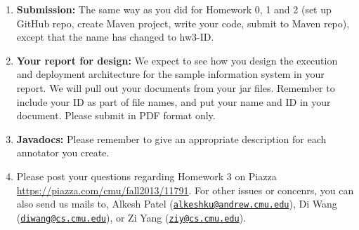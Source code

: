 \documentclass[oneside]{memoir}
\begin{document}
\begin{titlingpage}
\begin{minipage}{1.2\textwidth}
\begin{enumerate}

\item \textbf{Submission:} The same way as you did for Homework 0, 1 and 2 (set up
GitHub repo, create Maven project, write your code, submit to Maven repo),
except that the name has changed to hw3-ID.

\item \textbf{Your report for design:} We expect to see how you design the
execution and deployment architecture for the sample information system in your report. We will
pull out your documents from your jar files. Remember to include your ID as part
of file names, and put your name and ID in your document. Please submit in PDF
format only.

\item \textbf{Javadocs:} Please remember to give an appropriate description for
each annotator you create.

\item Please post your questions regarding Homework 3 on Piazza
\url{https://piazza.com/cmu/fall2013/11791}. For other issues or concenrs, you
can also send us mails to, Alkesh Patel
(\href{mailto:alkeshku@andrew.cmu.edu}{\nolinkurl{alkeshku@andrew.cmu.edu}}), Di
Wang (\href{mailto:diwang@cs.cmu.edu}{\nolinkurl{diwang@cs.cmu.edu}}), or Zi
Yang (\href{mailto:ziy@cs.cmu.edu}{\nolinkurl{ziy@cs.cmu.edu}}).

\end{enumerate}

\end{minipage}
\hspace{-0.1\textwidth}

\end{titlingpage}




%
\end{document}
